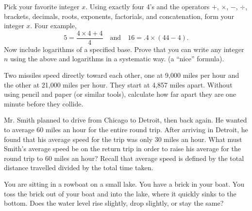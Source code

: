 \documentclass[12pt]{article}
\begin{document}
    \begin{exercise}
        Pick your favorite integer \(x\). Using exactly four 4's and the operators \(+\), \(\times\), \(-\), \(\div\), brackets, decimals, roots, exponents, factorials, and concatenation, form your integer \(x\). Four example, 
        \[5 = \frac{4\times 4 + 4}{4}\quad\text{and}\quad 16 = .4\times (44-4).\]
        Now include logarithms of a specified base. Prove that you can write any integer \(n\) using the above and logarithms in a systematic way. (a ``nice'' formula).
    \end{exercise}
    
    \begin{exercise}
        Two missiles speed directly toward each other, one at 9,000 miles per hour and the other at 21,000 miles per hour. They start at 4,857 miles apart. Without using pencil and paper (or similar tools), calculate how far apart they are one minute before they collide.
    \end{exercise}
    
    \begin{exercise}
        Mr. Smith planned to drive from Chicago to Detroit, then back again. He wanted to average 60 miles an hour for the entire round trip. After arriving in Detroit, he found that his average speed for the trip was only 30 miles an hour. What must Smith's average speed be on the return trip in order to raise his average for the round trip to 60 miles an hour? Recall that average speed is defined by the total distance travelled divided by the total time taken.
    \end{exercise}
    
    \begin{exercise}
        You are sitting in a rowboat on a small lake. You have a brick in your boat. You toss the brick out of your boat and into the lake, where it quickly sinks to the bottom. Does the water level rise slightly, drop slightly, or stay the same?
    \end{exercise}
    
\end{document}
